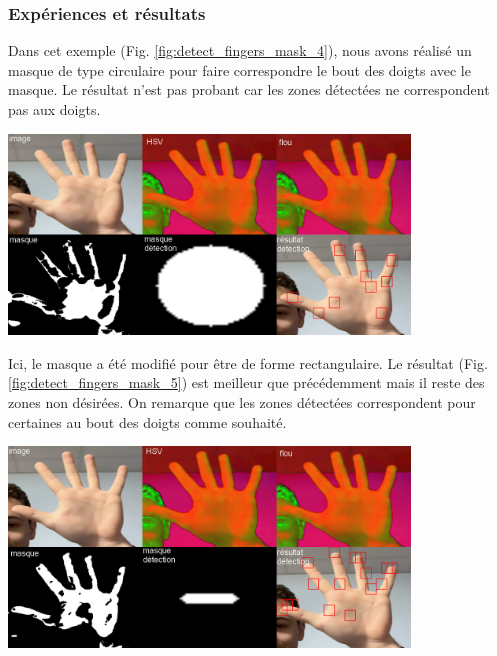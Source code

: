 \documentclass[11pt]{article}
\begin{document}
\subsubsection{Expériences et résultats}

Dans cet exemple (Fig. \ref{fig:detect_fingers_mask_4}), nous avons réalisé un masque de type circulaire pour faire correspondre
le bout des doigts avec le masque. Le résultat n'est pas probant car les zones détectées ne correspondent pas aux doigts.
\begin{center}
    \includegraphics[width=0.8\textwidth]{images/detect_fingers_mask_4.png}
    \label{fig:detect_fingers_mask_4}
\end{center}
\bigbreak


Ici, le masque a été modifié pour être de forme rectangulaire. Le résultat (Fig. \ref{fig:detect_fingers_mask_5}) est meilleur que précédemment mais il reste des zones non désirées.
On remarque que les zones détectées correspondent pour certaines au bout des doigts comme souhaité.
\begin{center}
    \includegraphics[width=0.8\textwidth]{images/detect_fingers_mask_5.png}
    \label{fig:detect_fingers_mask_5}
\end{center}
\newpage
\end{document}
